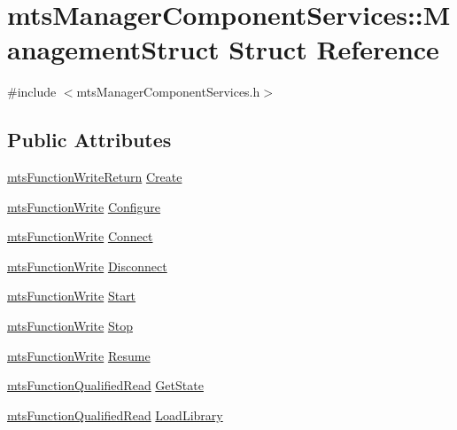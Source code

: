 \hypertarget{structmts_manager_component_services_1_1_management_struct}{}\section{mts\+Manager\+Component\+Services\+:\+:Management\+Struct Struct Reference}
\label{structmts_manager_component_services_1_1_management_struct}


{\ttfamily \#include $<$mts\+Manager\+Component\+Services.\+h$>$}

\subsection*{Public Attributes}
\begin{DoxyCompactItemize}
\item 
\hyperlink{classmts_function_write_return}{mts\+Function\+Write\+Return} \hyperlink{structmts_manager_component_services_1_1_management_struct_ade9314ac542774096dc400785a895a9f}{Create}
\item 
\hyperlink{classmts_function_write}{mts\+Function\+Write} \hyperlink{structmts_manager_component_services_1_1_management_struct_aa68ade6cba2367681d59fb29073bdf46}{Configure}
\item 
\hyperlink{classmts_function_write}{mts\+Function\+Write} \hyperlink{structmts_manager_component_services_1_1_management_struct_a9050a3d86db6adcc5dfbb424812b9516}{Connect}
\item 
\hyperlink{classmts_function_write}{mts\+Function\+Write} \hyperlink{structmts_manager_component_services_1_1_management_struct_a1848eee4af8aac811da04d8ad34006e5}{Disconnect}
\item 
\hyperlink{classmts_function_write}{mts\+Function\+Write} \hyperlink{structmts_manager_component_services_1_1_management_struct_a12bb1e5a539b17a03dcf9ec0f631787d}{Start}
\item 
\hyperlink{classmts_function_write}{mts\+Function\+Write} \hyperlink{structmts_manager_component_services_1_1_management_struct_a7a57c05959bfe8bb619c8a6f0b68e537}{Stop}
\item 
\hyperlink{classmts_function_write}{mts\+Function\+Write} \hyperlink{structmts_manager_component_services_1_1_management_struct_aeebd24c9dacfe39ed7b7a7d04d96aa85}{Resume}
\item 
\hyperlink{classmts_function_qualified_read}{mts\+Function\+Qualified\+Read} \hyperlink{structmts_manager_component_services_1_1_management_struct_a0e0d7c3b16ab312d9830d39927972b35}{Get\+State}
\item 
\hyperlink{classmts_function_qualified_read}{mts\+Function\+Qualified\+Read} \hyperlink{structmts_manager_component_services_1_1_management_struct_a296914ee8e623509138f4b2a30148eeb}{Load\+Library}
\end{DoxyCompactItemize}


